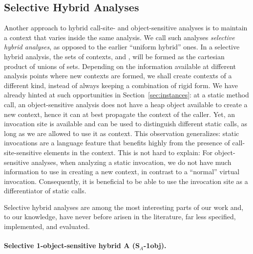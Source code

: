 \subsection{Selective Hybrid Analyses}

Another approach to hybrid call-site- and object-sensitive analyses is
to maintain a context that varies inside the same analysis. We call
such analyses \emph{selective hybrid analyses}, as opposed to the
earlier ``uniform hybrid'' ones. In a selective hybrid analysis, the
sets of contexts,  and , will be formed as the
cartesian product of unions of sets. Depending on the information
available at different analysis points where new contexts are formed,
we shall create contexts of a different kind, instead of always keeping
a combination of rigid form. We have already hinted at such
opportunities in Section~\ref{sec:instances}: at a static method call,
an object-sensitive analysis does not have a heap object available to
create a new context, hence it can at best propagate the context of
the caller. Yet, an invocation site is available and can be used to
distinguish different static calls, as long as we are allowed to use
it as context. This observation generalizes: static invocations are a
language feature that benefits highly from the presence of
call-site-sensitive elements in the context. This is not hard to
explain: For object-sensitive analyses, when analyzing a static
invocation, we do not have much information to use in creating a new
context, in contrast to a ``normal'' virtual invocation. Consequently,
it is beneficial to be able to use the invocation site as a
differentiator of static calls.

Selective hybrid analyses are among the most interesting parts of our
work and, to our knowledge, have never before arisen in the
literature, far less specified, implemented, and evaluated.



\paragraph{Selective 1-object-sensitive hybrid A (S$_A$-1obj).}

